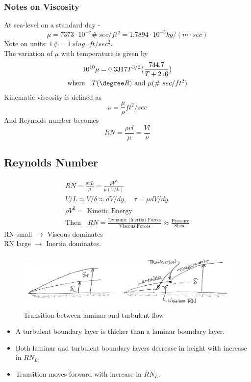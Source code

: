 \documentclass[draft=false, titlepage]{article}
\begin{document}
\subsubsection{Notes on Viscosity}
At sea-level on a standard day -
\begin{equation*}
\mu = 7373\cdot 10^{-7} \#\ sec/ft^2 = 1.7894 \cdot 10^{-5} kg/(m\cdot sec)
\end{equation*}
Note on units: $1 \# = 1\ slug \cdot ft/sec^2$.\\
The variation of $\mu$ with temperature is given by
\begin{gather*}
10^{10}\mu = 0.3317T^{3/2}\big( \frac{734.7}{T+216} \big)\\
\text{where}\quad T(\degree R) \text{ and } \mu(\#\ sec/ft^2)
\end{gather*}
Kinematic viscosity is defined as
\begin{equation*}
\nu = \frac{\mu}{\rho} ft^2/sec
\end{equation*}
And Reynolds number becomes
\begin{equation*}
RN = \frac{\rho vl}{\mu} = \frac{Vl}{\nu}
\end{equation*}

\subsection{Reynolds Number}
\begin{gather*}
RN = \frac{\rho vL}{\mu} = \frac{\rho V^2}{\mu (V/L)}\\
V/L \approx V/\delta \approx dV/dy,\quad \tau = \mu dV/dy\\
\rho V^2 = \text{ Kinetic Energy}\\
\text{Then} \quad RN = \frac{\text{Dynamic (Inertia) Forces}}{\text{Viscous Forces}} \approx \frac{\text{Pressure}}{\text{Shear}}
\end{gather*}
RN small $\rightarrow$ Viscous dominates\\
RN large $\rightarrow$ Inertia dominates.
\begin{figure}[ht]
	\centering
	\includegraphics[width=0.8\linewidth]{Figures/p24_transitionBoundary.PNG}
	\caption{Transition between laminar and turbulent flow}
	\label{fig:p24_transitionBoundary}
\end{figure}
\begin{itemize}
\item A turbulent boundary layer is thicker than a laminar boundary layer.
\item Both laminar and turbulent boundary layers decrease in height with increase in $RN_L$.
\item Transition moves forward with increase in $RN_L$.
\end{itemize}
\end{document}

